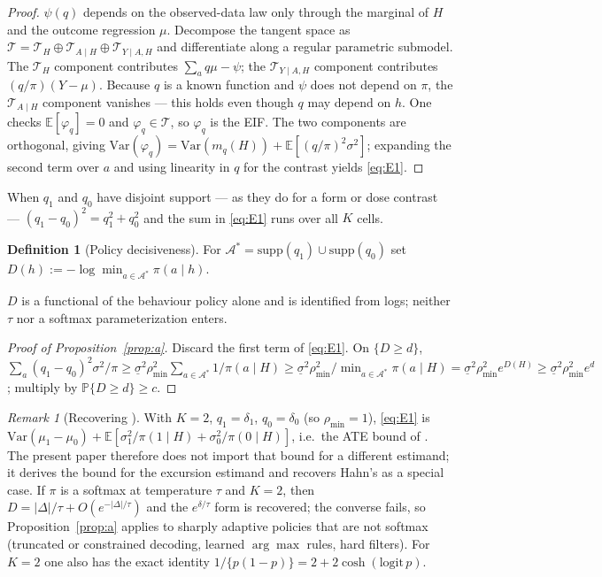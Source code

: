 \documentclass[11pt]{article}
\theoremstyle{definition}
\newtheorem{definition}{Definition}
\theoremstyle{remark}
\newtheorem{remark}{Remark}
\newcommand{\E}{\mathbb{E}}
\newcommand{\Prob}{\mathbb{P}}
\newcommand{\Var}{\mathrm{Var}}
\begin{document}
\begin{proof}
$\psi(q)$ depends on the observed-data law only through the marginal of $H$
and the outcome regression $\mu$. Decompose the tangent space as
$\mathcal{T} = \mathcal{T}_H \oplus \mathcal{T}_{A \mid H} \oplus
\mathcal{T}_{Y \mid A,H}$ and differentiate along a regular parametric
submodel. The $\mathcal{T}_H$ component contributes $\sum_a q\mu - \psi$;
the $\mathcal{T}_{Y \mid A,H}$ component contributes $(q/\pi)(Y - \mu)$.
Because $q$ is a known function and $\psi$ does not depend on $\pi$, the
$\mathcal{T}_{A \mid H}$ component vanishes --- this holds even though $q$
may depend on $h$. One checks $\E[\varphi_q] = 0$ and $\varphi_q \in
\mathcal{T}$, so $\varphi_q$ is the EIF. The two components are orthogonal,
giving $\Var(\varphi_q) = \Var(m_q(H)) + \E[(q/\pi)^2\sigma^2]$; expanding
the second term over $a$ and using linearity in $q$ for the contrast yields
\eqref{eq:E1}.
\end{proof}

When $q_1$ and $q_0$ have disjoint support --- as they do for a form or
dose contrast --- $(q_1 - q_0)^2 = q_1^2 + q_0^2$ and the sum in
\eqref{eq:E1} runs over all $K$ cells.

\begin{definition}[Policy decisiveness]\label{def:D}
For $\mathcal{A}^* = \mathrm{supp}(q_1) \cup \mathrm{supp}(q_0)$ set
$D(h) := -\log \min_{a \in \mathcal{A}^*} \pi(a \mid h)$.
\end{definition}

$D$ is a functional of the behaviour policy alone and is identified from
logs; neither $\tau$ nor a softmax parameterization enters.

\begin{proof}[Proof of Proposition~\ref{prop:a}]
Discard the first term of \eqref{eq:E1}. On $\{D \geq d\}$,
$\sum_a (q_1-q_0)^2 \sigma^2/\pi \geq \underline{\sigma}^2 \rho_{\min}^2
\sum_{a \in \mathcal{A}^*} 1/\pi(a \mid H) \geq \underline{\sigma}^2
\rho_{\min}^2 / \min_{a \in \mathcal{A}^*}\pi(a \mid H) =
\underline{\sigma}^2\rho_{\min}^2 e^{D(H)} \geq \underline{\sigma}^2
\rho_{\min}^2 e^{d}$; multiply by $\Prob\{D \geq d\} \geq c$.
\end{proof}

\begin{remark}[Recovering \citet{hahn1998role}]
With $K = 2$, $q_1 = \delta_1$, $q_0 = \delta_0$ (so $\rho_{\min} = 1$),
\eqref{eq:E1} is $\Var(\mu_1 - \mu_0) + \E[\sigma_1^2/\pi(1 \mid H) +
\sigma_0^2/\pi(0 \mid H)]$, i.e.\ the ATE bound of \citet{hahn1998role}. The
present paper therefore does not import that bound for a different estimand;
it derives the bound for the excursion estimand and recovers Hahn's as a
special case. If $\pi$ is a softmax at temperature $\tau$ and $K=2$, then
$D = |\Delta|/\tau + O(e^{-|\Delta|/\tau})$ and the $e^{\delta/\tau}$ form is
recovered; the converse fails, so Proposition~\ref{prop:a} applies to
sharply adaptive policies that are not softmax (truncated or constrained
decoding, learned $\arg\max$ rules, hard filters). For $K=2$ one also has the
exact identity $1/\{p(1-p)\} = 2 + 2\cosh(\mathrm{logit}\,p)$.
\end{remark}
\end{document}
